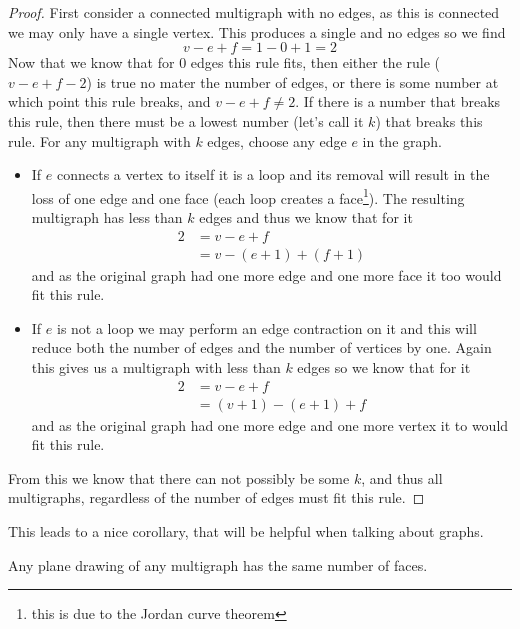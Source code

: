 \documentclass{article}
\begin{document}
\begin{proof}
	First consider a connected multigraph with no edges, as this is connected we may only have a single vertex. This produces a single and no edges so we find $$v-e+f=1-0+1=2$$ Now that we know that for 0 edges this rule fits, then either the rule ($v-e+f-2$) is true no mater the number of edges, or there is some number at which point this rule breaks, and $v-e+f\not=2$. If there is a number that breaks this rule, then there must be a lowest number (let's call it $k$) that breaks this rule. For any multigraph with $k$ edges, choose any edge $e$ in the graph.
	\begin{itemize}
		\item If $e$ connects a vertex to itself it is a loop and its removal will result in the loss of one edge and one face (each loop creates a face\footnote{this is due to the Jordan curve theorem}). The resulting multigraph has less than $k$ edges and thus we know that for it \begin{align*}2&=v-e+f \\&= v-(e+1)+(f+1)\end{align*} and as the original graph had one more edge and one more face it too would fit this rule.
		\item If $e$ is not a loop we may perform an edge contraction on it and this will reduce both the number of edges and the number of vertices by one. Again this gives us a multigraph with less than $k$ edges so we know that for it \begin{align*}2&=v-e+f\\&=(v+1)-(e+1)+f\end{align*} and as the original graph had one more edge and one more vertex it to would fit this rule.
	\end{itemize}
	
	From this we know that there can not possibly be some $k$, and thus all multigraphs, regardless of the number of edges must fit this rule.
\end{proof}
This leads to a nice corollary, that will be helpful when talking about graphs.
\begin{corallary}
	Any plane drawing of any multigraph has the same number of faces.
\end{corallary}
\end{document}
